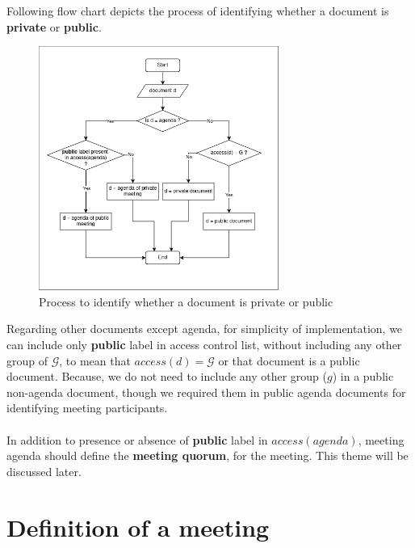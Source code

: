 \documentclass{article}
\begin{document}
\noindent
Following flow chart depicts the process of identifying whether a document is \textbf{private} or \textbf{public}.
\begin{figure}[H]
    \centering
    \includegraphics[width=0.7\textwidth]{./image/document_puclic_vs_private_classification.png}
    \caption{Process to identify whether a document is private or public}
    \label{fig:sample}
\end{figure} 

\noindent
Regarding other documents except agenda, for simplicity of implementation, we can include only \textbf{public} label in access control list, without including any other group of $\mathcal{G}$, to mean that $access(d) = \mathcal{G}$ or that document is a public document. Because, we do not need to include any other group ($g$) in a public non-agenda document, though we required them in public agenda documents for identifying meeting participants.\\ \\
\noindent
In addition to presence or absence of \textbf{public} label in $access(agenda)$, meeting agenda should define the \textbf{meeting quorum}, for the meeting. This theme will be discussed later.

\section{Definition of a meeting}
\end{document}
